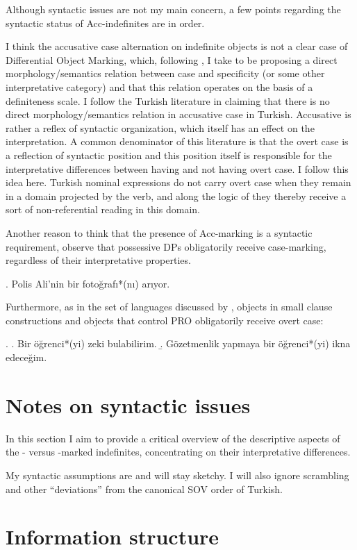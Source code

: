 \documentclass[11pt,a4paper]{article}
\begin{document}
Although syntactic issues are not my main concern, a few points
regarding the syntactic status of Acc-indefinites are in order.

I think the accusative case alternation on indefinite objects is not a
clear case of Differential Object Marking, which, following
\cite{lopez12}, I take to be proposing a direct morphology/semantics
relation between case and specificity (or some other interpretative
category) and that this relation operates on the basis of a
definiteness scale. I follow the Turkish literature in claiming that
there is no direct morphology/semantics relation in accusative case in
Turkish. Accusative is rather a reflex of syntactic organization,
which itself has an effect on the interpretation. A common denominator
of this literature is that the overt case is a reflection of syntactic
position and this position itself is responsible for the
interpretative differences between having and not having overt case. I
follow this idea here. Turkish nominal expressions do not carry overt
case when they remain in a domain projected by the verb, and along the
logic of  they thereby receive a sort of
non-referential reading in this domain.

Another reason to think that the presence of Acc-marking is a
syntactic requirement, observe that possessive DPs obligatorily
receive case-marking, regardless of their interpretative properties.

\ex. Polis Ali'nin bir fotoğrafı*(nı) arıyor.

Furthermore, as in the set of languages discussed by \cite{lopez12},
objects in small clause constructions and objects that control PRO
obligatorily receive overt case:

\ex.
\a. Bir öğrenci*(yi) zeki bulabilirim.
\b. Gözetmenlik yapmaya bir öğrenci*(yi) ikna edeceğim. 


\section{Notes on syntactic issues}

In this section I aim to provide a critical overview of the
descriptive aspects of the \acc- versus \zero-marked indefinites,
concentrating on their interpretative differences.

My syntactic assumptions are and will stay sketchy. I will also ignore
scrambling and other ``deviations'' from the canonical SOV order of
Turkish.

\section{Information structure}
\end{document}
